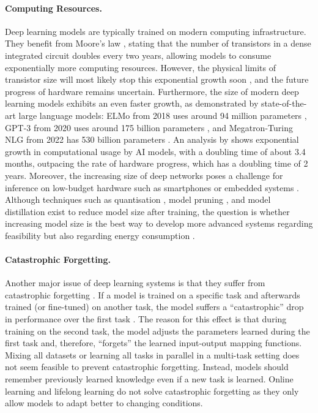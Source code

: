\paragraph{Computing Resources.} Deep learning models are typically trained on modern computing infrastructure. They benefit from Moore's law , stating that the number of transistors in a dense integrated circuit doubles every two years, allowing models to consume exponentially more computing resources. However, the physical limits of transistor size will most likely stop this exponential growth soon , and the future progress of hardware remains uncertain.
Furthermore, the size of modern deep learning models exhibits an even faster growth, as demonstrated by state-of-the-art large language models: 
ELMo from 2018 uses around 94 million parameters , 
GPT-3 from 2020 uses around 175 billion parameters , and Megatron-Turing NLG from 2022 has 530 billion parameters \cite{smith_using_2022}.
An analysis by  shows exponential growth in computational usage by AI models, with a doubling time of about 3.4 months, outpacing the rate of hardware progress, which has a doubling time of 2 years. Moreover, the increasing size of deep networks poses a challenge for inference on low-budget hardware such as smartphones or embedded systems \cite{berthelier_deep_2021}. Although techniques such as quantisation \cite{wu_integer_2020}, model pruning , and model distillation  exist to reduce model size after training, the question is whether increasing model size is the best way to develop more advanced systems regarding feasibility but also regarding energy consumption .

\paragraph{Catastrophic Forgetting.} Another major issue of deep learning systems is that they suffer from catastrophic forgetting .
If a model is trained on a specific task and afterwards trained (or fine-tuned) on another task, the model suffers a ``catastrophic'' drop in performance over the first task \cite{kirkpatrick_overcoming_2017}.
The reason for this effect is that during training on the second task, the model adjusts the parameters learned during the first task and, therefore, ``forgets'' the learned input-output mapping functions.
Mixing all datasets or learning all tasks in parallel in a multi-task setting  does not seem feasible to prevent catastrophic forgetting. Instead, models should remember previously learned knowledge even if a new task is learned.
Online learning \cite{sahoo_online_2018} and lifelong learning \cite{parisi_continual_2019} do not solve catastrophic forgetting as they only allow models to adapt better to changing conditions.

